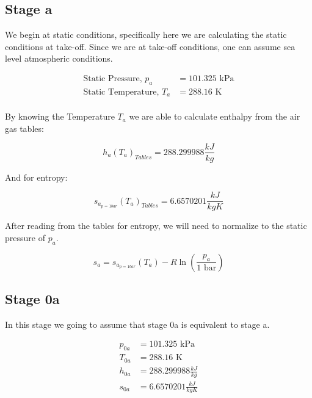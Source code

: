 \documentclass[titlepage]{article}
\begin{document}
    \subsection{Stage a}

    We begin at static conditions, specifically here we are calculating the static conditions at take-off. Since we are at take-off conditions, one can assume sea level atmospheric conditions.

    \begin{equation}
        \begin{aligned}
            \text{Static Pressure, $p_{a}$} &= 101.325 \text{ kPa} \\
            \text{Static Temperature, $T_{a}$} &= 288.16 \text{ K} \\
        \end{aligned}
    \end{equation}

    By knowing the Temperature $T_{a}$ we are able to calculate enthalpy from the air gas tables:

    \begin{equation}
        h_{a}(T_{a})_{Tables} = 288.299988 \frac{kJ}{kg}
    \end{equation}

    And for entropy:

    \begin{equation}
        s_{a_{p=1 bar}}(T_{a})_{Tables} = 6.6570201 \frac{kJ}{kg K}
    \end{equation}

    After reading from the tables for entropy, we will need to normalize to the static pressure of $p_{a}$.

    \begin{equation}
        s_{a} = s_{a_{p=1 bar}}(T_{a}) - R \ln \left( \frac{p_{a}}{1 \text{ bar}} \right)
    \end{equation}

    \subsection{Stage 0a}
    In this stage we going to assume that stage 0a is equivalent to stage a. 

    \begin{equation}
        \begin{aligned}
            \text{$p_{0a}$} &= 101.325 \text{ kPa} \\
            \text{$T_{0a}$} &= 288.16 \text{ K} \\
            \text{$h_{0a}$} &= 288.299988 \frac{kJ}{kg} \\
            \text{$s_{0a}$} &= 6.6570201 \frac{kJ}{kg K} \\
        \end{aligned}
    \end{equation}
\end{document}
